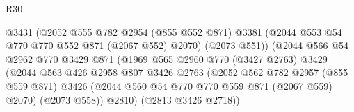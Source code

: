 \begin{lexlean}{R30}
\begin{coremodule}
                                          @3431
                                          (@2052
                                            @555
                                            @782
                                            @2954
                                            (@855 @552 @871)
                                            @3381
                                            (@2044 @553 @54 @770 @770 @552 @871 (@2067 @552) @2070)
                                            (@2073 @551))
                                          (@2044
                                            @566
                                            @54
                                            @2962
                                            @770
                                            @3429
                                            @871
                                            (@1969
                                              @565
                                              @2960
                                              @770
                                              (@3427 @2763)
                                              @3429
                                              (@2044
                                                @563
                                                @426
                                                @2958
                                                @807
                                                @3426
                                                @2763
                                                (@2052
                                                  @562
                                                  @782
                                                  @2957
                                                  (@855 @559 @871)
                                                  @3426
                                                  (@2044
                                                    @560
                                                    @54
                                                    @770
                                                    @770
                                                    @559
                                                    @871
                                                    (@2067 @559)
                                                    @2070)
                                                  (@2073 @558))
                                                @2810)
                                              (@2813 @3426 @2718))

\end{coremodule}
\end{lexlean}
